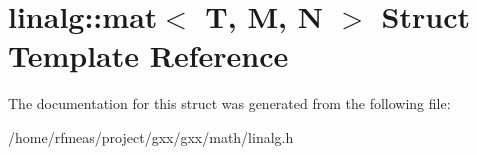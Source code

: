 \hypertarget{structlinalg_1_1mat}{}\section{linalg\+:\+:mat$<$ T, M, N $>$ Struct Template Reference}
\label{structlinalg_1_1mat}


The documentation for this struct was generated from the following file\+:\begin{DoxyCompactItemize}
\item 
/home/rfmeas/project/gxx/gxx/math/linalg.\+h\end{DoxyCompactItemize}
